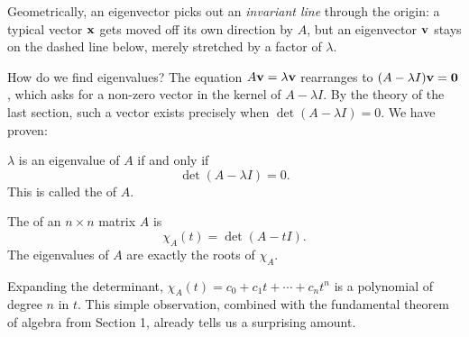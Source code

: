\documentclass[a4paper]{scrartcl}
\begin{document}
Geometrically, an eigenvector picks out an \emph{invariant line} through the origin: a typical vector $\mathbf{x}$ gets moved off its own direction by $A$, but an eigenvector $\mathbf{v}$ stays on the dashed line below, merely stretched by a factor of $\lambda$.

\begin{center}
\end{center}

How do we find eigenvalues? The equation $A \mathbf{v} = \lambda \mathbf{v}$ rearranges to $(A - \lambda I)\mathbf{v} = \mathbf{0}$, which asks for a non-zero vector in the kernel of $A - \lambda I$. By the theory of the last section, such a vector exists precisely when $\det(A - \lambda I) = 0$. We have proven:

\begin{proposition}
	$\lambda$ is an eigenvalue of $A$ if and only if
	$$
	\det (A - \lambda I) = 0.
	$$
	This is called the  of $A$.
\end{proposition}

\begin{definition}
	The  of an $n \times n$ matrix $A$ is
	$$
	\chi_A(t) = \det(A - tI).
	$$
	The eigenvalues of $A$ are exactly the roots of $\chi_A$.
\end{definition}

Expanding the determinant, $\chi_A(t) = c_0 + c_1 t + \cdots + c_n t^n$ is a polynomial of degree $n$ in $t$. This simple observation, combined with the fundamental theorem of algebra from Section 1, already tells us a surprising amount.
\end{document}
